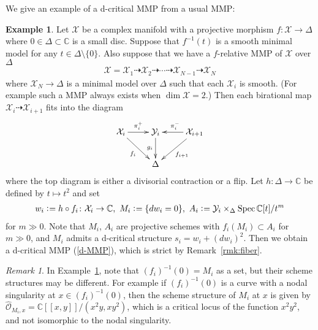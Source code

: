 \documentclass[11pt]{amsart}
\theoremstyle{plain}
\theoremstyle{definition}
\newtheorem{exam}[thm]{Example}
\theoremstyle{remark}
\newtheorem{rmk}[thm]{Remark}
\newcommand{\oO}{\mathcal{O}}
\newcommand{\xX}{\mathcal{X}}
\newcommand{\yY}{\mathcal{Y}}
\newcommand{\Spec}{\mathop{\rm Spec}\nolimits}
\begin{document}
We give an example of a d-critical MMP 
from a usual MMP: 
\begin{exam}\label{ex:mmp}
Let $\xX$ be a complex manifold with a projective 
morphism $f \colon \xX \to \Delta$
where $0 \in \Delta \subset \mathbb{C}$ is a small disc. 
Suppose that $f^{-1}(t)$ is a smooth 
minimal model for any $t \in \Delta \setminus \{0\}$. 
Also suppose that we have a $f$-relative 
MMP of $\xX$ over $\Delta$
\begin{align*}
\xX=\xX_1 \dashrightarrow \xX_2 \dashrightarrow \cdots \dashrightarrow 
\xX_{N-1} \dashrightarrow \xX_N
\end{align*}
where $\xX_N \to \Delta$ is a minimal model over $\Delta$
such that each $\xX_i$ is smooth. 
(For example such a MMP always exists when $\dim \xX=2$.)
Then each birational map 
$\xX_i \dashrightarrow \xX_{i+1}$ fits into the diagram
\begin{align*}
\xymatrix{
\xX_i \ar[r]^-{\pi_i^+}  \ar[dr]_-{f_i} & \yY_i \ar[d]_-{g_i} & \ar[l]_{\pi_{i}^-} \ar[ld]^-{f_{i+1}} \xX_{i+1} \\
& \Delta &
}
\end{align*}
where the top diagram is either a divisorial contraction or a flip. 
Let $h \colon \Delta \to \mathbb{C}$ be
defined by $t \mapsto t^2$ and 
set 
\begin{align*}
w_i \cneq h \circ f_i \colon \xX_i \to \mathbb{C}, \ 
M_i \cneq \{dw_i=0\}, \ 
A_i \cneq \yY_i \times_{\Delta} \Spec \mathbb{C}[t]/t^m
\end{align*}
for $m\gg 0$. Note that $M_i$, $A_i$ are projective schemes
with $f_i(M_i) \subset A_i$ for $m\gg 0$, 
and $M_i$ admits a d-critical 
structure 
$s_i=w_i+(dw_i)^2$. 
Then we obtain 
a d-critical MMP (\ref{d-MMP}),
 which is strict by Remark~\ref{rmk:fiber}. 
\end{exam}

\begin{rmk}\label{rmk:schemestr}
In Example~\ref{ex:mmp}, note that $(f_i)^{-1}(0)=M_i$ as a set, but 
their scheme structures may be different. 
For example if $(f_i)^{-1}(0)$ is a curve 
with a nodal singularity at $x \in (f_i)^{-1}(0)$, 
then the scheme structure of $M_i$ at $x$
is given by $\widehat{\oO}_{M_i, x}=\mathbb{C}[[x, y]]/(x^2 y, xy^2)$,
which is a critical locus of 
the function $x^2 y^2$, and not isomorphic to the nodal singularity. 
\end{rmk}
\end{document}
